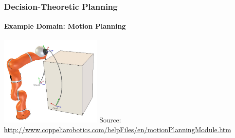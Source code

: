 \begin{frame}
\frametitle{Decision-Theoretic Planning}
\framesubtitle{Example Domain: Motion Planning}
\begin{center}
\includegraphics[width=0.38\textwidth]{figures/motion-planning}
\vfill
{\tiny Source: \url{http://www.coppeliarobotics.com/helpFiles/en/motionPlanningModule.htm}}
\end{center}
\end{frame}

